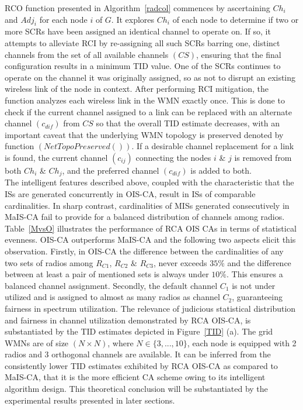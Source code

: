 \documentclass[conference]{IEEEtran}
\begin{document}
RCO function presented in Algorithm~\ref{radcol} commences by ascertaining $Ch_i$ and $Adj_i$ for each node $i$ of $G$. It explores $Ch_i$ of each node to determine if two or more SCRs have been assigned an identical channel to operate on. If so, it attempts to alleviate RCI by re-assigning all such SCRs barring one, distinct channels from the set of all available channels $(CS)$, ensuring that the final configuration results in a minimum TID value. One of the SCRs continues to operate on the channel it was originally assigned, so as not to disrupt an existing wireless link of the node in context. After performing RCI mitigation, the function analyzes each wireless link in the WMN exactly once. This is done to check if the current channel assigned to a link can be replaced with an alternate channel $(c_{dif})$ from $CS$ so that the overall TID estimate decreases, with an important caveat that the underlying WMN topology is preserved denoted by function $(NetTopoPreserved())$. If a desirable channel 
replacement for a link is found, the current channel $(c_{ij})$ connecting the nodes  $i$ \& $j$ is removed from both $Ch_i$ \& $Ch_j$, and the preferred channel  $(c_{dif})$ is added to both.\\
The intelligent features described above, coupled with the characteristic that the ISs are generated concurrently in OIS-CA, result in ISs of comparable cardinalities. In sharp contrast, cardinalities of MISs generated consecutively in MaIS-CA fail to provide for a balanced distribution of channels among radios. Table~\ref{MvsO} illustrates the performance of RCA OIS CAs in terms of statistical evenness. OIS-CA outperforms MaIS-CA and the following two aspects elicit this observation. Firstly, in OIS-CA the difference between the cardinalities of any two sets of radios among $R_{C1}$, $R_{C2}$ $\&$ $R_{C3}$, never exceeds $35\%$ and the difference between at least a pair of mentioned sets is always under $10\%$. This ensures a balanced channel assignment. Secondly, the default channel $C_1$ is not under utilized and is assigned to almost as many radios as channel $C_2$, guaranteeing fairness in spectrum utilization. The relevance of judicious statistical distribution and fairness in channel utilization 
demonstrated by 
RCA OIS-CA, is substantiated by the TID estimates depicted in Figure~\ref{TID} (a). The grid WMNs are of size $(N\times N)$, where $N\in \{3,...,10\}$, each node is equipped with 2 radios and 3 orthogonal channels are available. It can be inferred from the consistently lower TID estimates exhibited by RCA OIS-CA as compared to MaIS-CA, that it is the more efficient CA scheme owing to its intelligent algorithm design. This theoretical conclusion will be substantiated by the experimental results presented in later sections.
\end{document}
